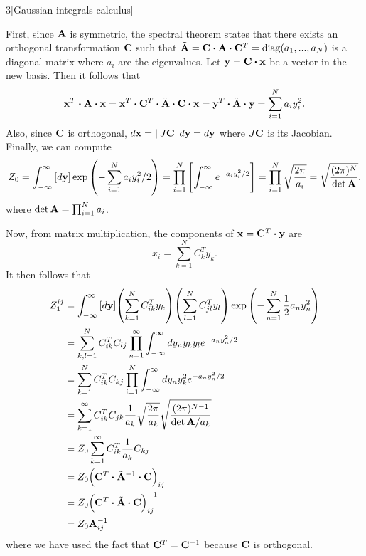 \documentclass[12pt]{article}
\begin{document}
\begin{problem}{3}[Gaussian integrals calculus]
\begin{solution}
First, since $\vb{A}$ is symmetric, the spectral theorem states that there
exists an orthogonal transformation $\vb{C}$ such that
$\tilde{\vb{A}}=\vb{C}\vdot\vb{A}\vdot\vb{C}^T=\text{diag}(a_1,...,a_N)$ is a diagonal
matrix where $a_i$ are the eigenvalues. Let $\vb{y}=\vb{C}\vdot\vb{x}$ be a
vector in the new basis. Then it follows that
\begin{equation}
    \vb{x}^T\vdot\vb{A}\vdot\vb{x}
    =\vb{x}^T\vdot\vb{C}^T\vdot\tilde{\vb{A}}\vdot\vb{C}\vdot\vb{x}
    =\vb{y}^T\vdot\tilde{\vb{A}}\vdot\vb{y}
    =\sum_{i=1}^Na_iy_i^2.
\end{equation}
Also, since $\vb{C}$ is orthogonal, $d\vb{x}=\norm{J\vb{C}}d\vb{y}=d\vb{y}$
where $J\vb{C}$ is its Jacobian. Finally, we can compute
\begin{align}
    Z_0
    =\int_{-\infty}^\infty\qty[d\vb{y}]
    \exp\qty(-\sum_{i=1}^Na_iy_i^2/2)
    =\prod_{i=1}^N\qty[\int_{-\infty}^\infty e^{-a_iy_i^2/2}]
    =\prod_{i=1}^N\sqrt{\frac{2\pi}{a_i}}
    =\sqrt{\frac{(2\pi)^N}{\det\vb{A}}}.
\end{align}
where $\det\vb{A}=\prod_{i=1}^Na_i$.


Now, from matrix multiplication, the components of $\vb{x}=\vb{C}^T\vdot\vb{y}$
are
\begin{equation}
    x_i=\sum_{k=1}^NC_k^Ty_k .
\end{equation}
It then follows that
\begin{align}
    Z_1^{ij}
    &=\int_{-\infty}^\infty\qty[d\vb{y}]
    \qty(\sum_{k=1}^NC_{ik}^Ty_k)\qty(\sum_{l=1}^NC_{jl}^Ty_l)
    \exp\qty(-\sum_{n=1}^N\frac12a_ny_n^2)\notag\\
    &=\sum_{k,l=1}^NC_{ik}^TC_{lj}\prod_{n=1}^\infty
        \int_{-\infty}^\infty dy_n y_ky_le^{-a_ny_n^2/2}\notag\\
    &=\sum_{k=1}^NC_{ik}^TC_{kj}\prod_{i=1}^N\int_{-\infty}^\infty
    dy_ny_k^2e^{-a_ny_n^2/2}\notag\\
    &=\sum_{k=1}^\infty C_{ik}^TC_{jk}\frac1{a_k}\sqrt{\frac{2\pi}{a_k}}
    \sqrt{\frac{(2\pi)^{N-1}}{\det\vb{A}/a_k}}\notag\\
    &=Z_0\sum_{k=1}^\infty C_{ik}^T\frac1{a_k}C_{kj}\notag\\
    &=Z_0\qty(\vb{C}^T\vdot\tilde{\vb{A}}^{-1}\vdot\vb{C})_{ij}\notag\\
    &=Z_0\qty(\vb{C}^T\vdot\tilde{\vb{A}}\vdot\vb{C})_{ij}^{-1}\notag\\
    &=Z_0\vb{A}_{ij}^{-1}
\end{align}
where we have used the fact that $\vb{C}^T=\vb{C}^{-1}$ because $\vb{C}$ is
orthogonal.


\end{solution}
\end{problem}
\end{document}
